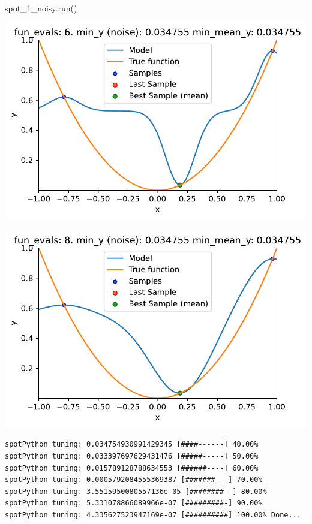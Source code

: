 \documentclass[
  letterpaper,
  DIV=11,
  numbers=noendperiod]{scrreprt}
\newenvironment{Shaded}{\begin{snugshade}}{\end{snugshade}}
\newcommand{\NormalTok}[1]{\textcolor[rgb]{0.00,0.23,0.31}{#1}}
\begin{document}
\begin{Shaded}
\begin{Highlighting}[]
\NormalTok{spot\_1\_noisy.run()}
\end{Highlighting}
\end{Shaded}

\includegraphics{013_num_spot_noisy_files/figure-pdf/cell-10-output-1.pdf}

\includegraphics{013_num_spot_noisy_files/figure-pdf/cell-10-output-2.pdf}

\begin{verbatim}
spotPython tuning: 0.034754930991429345 [####------] 40.00% 
spotPython tuning: 0.033397697629431476 [#####-----] 50.00% 
spotPython tuning: 0.015789128788634553 [######----] 60.00% 
spotPython tuning: 0.0005792084555369387 [#######---] 70.00% 
spotPython tuning: 3.5515950080557136e-05 [########--] 80.00% 
spotPython tuning: 5.331078866089966e-07 [#########-] 90.00% 
spotPython tuning: 4.335627523947169e-07 [##########] 100.00% Done...
\end{verbatim}
\end{document}
